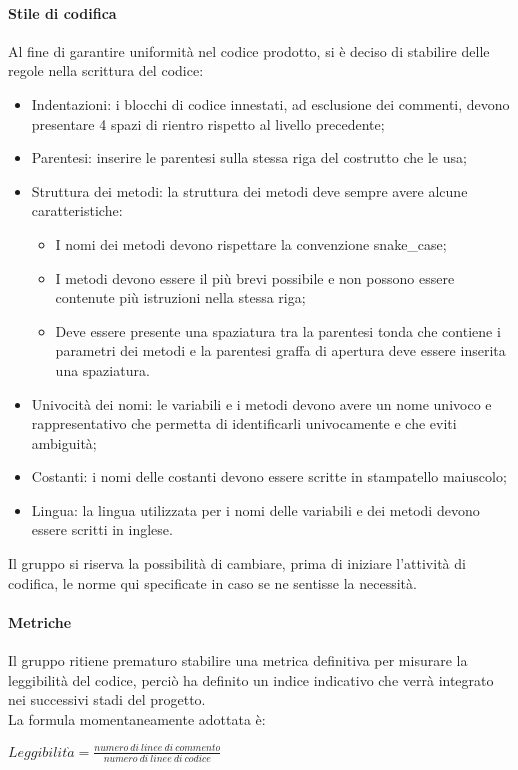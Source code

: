 \documentclass[../norme_di_progetto.tex]{subfiles}
\begin{document}
    \paragraph{Stile di codifica}
    Al fine di garantire uniformità nel codice prodotto, si è deciso di stabilire delle regole nella scrittura del codice:
    \begin{itemize}
        \item Indentazioni: i blocchi di codice innestati, ad esclusione dei commenti, devono presentare 4 spazi di rientro rispetto al livello precedente;
        \item Parentesi: inserire le parentesi sulla stessa riga del costrutto che le usa;
        \item Struttura dei metodi: la struttura dei metodi deve sempre avere alcune caratteristiche:
        \begin{itemize}
            \item I nomi dei metodi devono rispettare la convenzione snake\_case;
            \item I metodi devono essere il più brevi possibile e non possono essere contenute più istruzioni nella stessa riga;
            \item Deve essere presente una spaziatura tra la parentesi tonda che contiene i parametri dei metodi e la parentesi graffa di apertura deve essere inserita una spaziatura.
        \end{itemize}
        \item Univocità dei nomi: le variabili e i metodi devono avere un nome univoco e rappresentativo che permetta di identificarli univocamente e che eviti ambiguità;
        \item Costanti: i nomi delle costanti devono essere scritte in stampatello maiuscolo;
        \item Lingua: la lingua utilizzata per i nomi delle variabili e dei metodi devono essere scritti in inglese.
    \end{itemize}
    Il gruppo si riserva la possibilità di cambiare, prima di iniziare l'attività di codifica, le norme qui specificate in caso se ne sentisse la necessità.

    \paragraph{Metriche}
    Il gruppo ritiene prematuro stabilire una metrica definitiva per misurare la leggibilità del codice, perciò ha definito un indice indicativo che verrà integrato nei successivi stadi del progetto.\\
    La formula momentaneamente adottata è:
    \begin{center}
        $Leggibilit\grave{a} = \frac{numero\ di\ linee\ di\ commento}{numero\ di\ linee\ di\ codice}$
    \end{center}
\end{document}
